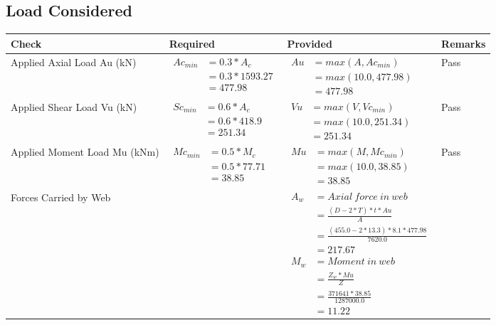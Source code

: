 \documentclass{article}%
\begin{document}
\subsection{Load Considered}%
\label{subsec:LoadConsidered}%
\renewcommand{\arraystretch}{1.2}%
\begin{longtable}{|p{4cm}|p{5cm}|p{5.5cm}|p{1.5cm}|}%
\hline%
\rowcolor{OsdagGreen}%
Check&Required&Provided&Remarks\\%
\hline%
\endhead%
\hline%
Applied Axial Load Au (kN)&$\begin{aligned} Ac_{min} &= 0.3 * A_c\\ &= 0.3 *1593.27\\ &=477.98\end{aligned}$&$\begin{aligned} Au &= max(A,Ac_{min} )\\ &= max( 10.0,477.98)\\ &=477.98\end{aligned}$&Pass\\%
\hline%
Applied Shear Load Vu (kN)&$\begin{aligned} Sc_{min} &= 0.6 * A_c\\ &= 0.6 *418.9\\ &=251.34\end{aligned}$&$\begin{aligned} Vu &= max(V,Vc_{min})\\ &=  max(10.0,251.34)\\ &=251.34\end{aligned}$&Pass\\%
\hline%
Applied Moment Load Mu (kNm)&$\begin{aligned} Mc_{min} &= 0.5 * M_c\\ &= 0.5 *77.71\\ &=38.85\end{aligned}$&$\begin{aligned} Mu &= max(M,Mc_{min} )\\ &= max(10.0,38.85)\\ &=38.85\end{aligned}$&Pass\\%
\hline%
Forces Carried by Web&&$\begin{aligned}A_w &= Axial~ force~ in~ web  \\   &= \frac{(D- 2*T)*t* Au }{A} \\ &= \frac{(455.0- 2*13.3)*8.1*477.98 }{7620.0} \\ &=217.67\\ M_w &= Moment ~in ~web  \\  &= \frac{Z_w * Mu}{Z} \\ &= \frac{371641 * 38.85}{1287000.0} \\ &=11.22\end{aligned}$&\\%

\end{longtable}
\end{document}

